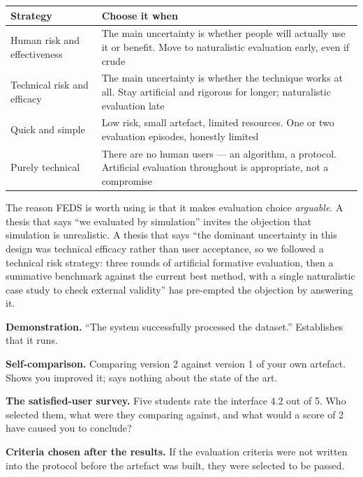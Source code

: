 \begin{center}
\small
\begin{tabular}{@{}L{3.6cm}L{10.7cm}@{}}
\toprule
\textbf{Strategy} & \textbf{Choose it when} \\
\midrule
Human risk and effectiveness
  & The main uncertainty is whether people will actually use it or benefit.
    Move to naturalistic evaluation early, even if crude \\
Technical risk and efficacy
  & The main uncertainty is whether the technique works at all. Stay
    artificial and rigorous for longer; naturalistic evaluation late \\
Quick and simple
  & Low risk, small artefact, limited resources. One or two evaluation
    episodes, honestly limited \\
Purely technical
  & There are no human users --- an algorithm, a protocol. Artificial
    evaluation throughout is appropriate, not a compromise \\
\bottomrule
\end{tabular}
\end{center}

\begin{conceptbox}
The reason FEDS is worth using is that it makes evaluation choice
\emph{arguable}. A thesis that says ``we evaluated by simulation'' invites the
objection that simulation is unrealistic. A thesis that says ``the dominant
uncertainty in this design was technical efficacy rather than user acceptance,
so we followed a technical risk strategy: three rounds of artificial formative
evaluation, then a summative benchmark against the current best method, with a
single naturalistic case study to check external validity'' has pre-empted the
objection by answering it.
\end{conceptbox}

\begin{pitfall}
\begin{tight}
  \item \textbf{Demonstration.} ``The system successfully processed the
    dataset.'' Establishes that it runs.
  \item \textbf{Self-comparison.} Comparing version 2 against version 1 of your
    own artefact. Shows you improved it; says nothing about the state of the
    art.
  \item \textbf{The satisfied-user survey.} Five students rate the interface
    4.2 out of 5. Who selected them, what were they comparing against, and what
    would a score of 2 have caused you to conclude?
  \item \textbf{Criteria chosen after the results.} If the evaluation criteria
    were not written into the protocol before the artefact was built, they
    were selected to be passed.
\end{tight}
\end{pitfall}

